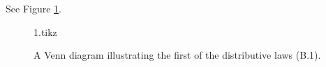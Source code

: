 \exercise
See Figure \ref{fig:B.1-1}.
\begin{figure}[htb]
    {1.tikz}
    \caption{A Venn diagram illustrating the first of the distributive laws (B.1).} \label{fig:B.1-1}
\end{figure}
